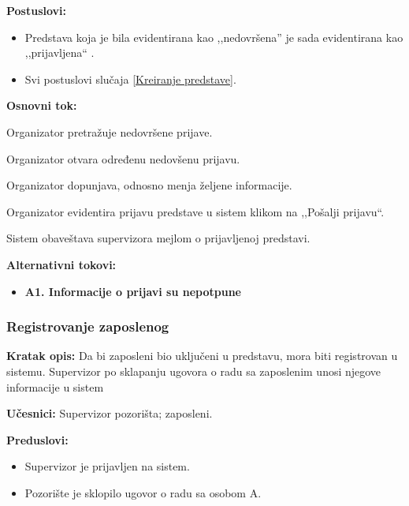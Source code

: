 \documentclass[a4paper]{article}
\begin{document}
\noindent\textbf{Postuslovi:} 
  \begin{itemize}
    \item Predstava koja je bila evidentirana kao ,,nedovršena'' je sada evidentirana kao ,,prijavljena`` .
    \item Svi postuslovi slučaja \ref{Kreiranje predstave}.
  \end{itemize}

\noindent\textbf{Osnovni tok:}
  \begin{legal}
    \item Organizator pretražuje nedovršene prijave.
    \item Organizator otvara određenu nedovšenu prijavu. 
    \item Organizator dopunjava, odnosno menja željene informacije.
    \item Organizator evidentira prijavu predstave u sistem klikom na ,,Pošalji prijavu``. 
    \item Sistem obaveštava supervizora mejlom o prijavljenoj predstavi.
  \end{legal}

\noindent\textbf{Alternativni tokovi:} 
\begin{itemize}
  \item \textbf{A1. Informacije o prijavi su nepotpune} 
\end{itemize}


\subsubsection{Registrovanje zaposlenog} \label{Registrovanje zaposlenih}
\noindent\textbf{Kratak opis:} Da bi zaposleni bio uključeni u predstavu, mora biti registrovan u sistemu. Supervizor po sklapanju ugovora o radu sa zaposlenim unosi njegove informacije u sistem

\noindent\textbf{Učesnici:} Supervizor pozorišta; zaposleni.

\noindent\textbf{Preduslovi:}
  \begin{itemize}
    \item Supervizor je prijavljen na sistem.
    \item Pozorište je sklopilo ugovor o radu sa osobom A.
  \end{itemize}
\end{document}

